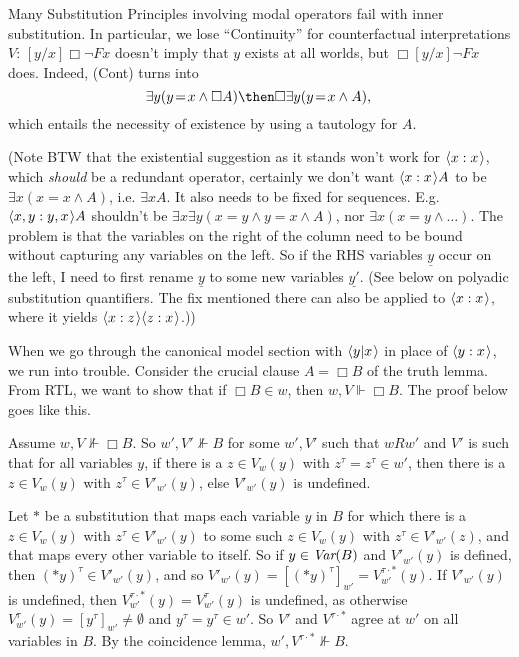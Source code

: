 \documentclass[11pt]{woarticle}
\theoremstyle{break}
\theoremstyle{nonumberplain}
\newcommand{\SAT}{\Vdash}
\newcommand{\1}{\;\,|\;\,}
\newcommand{\var}{\emph{Var}}
\renewcommand{\t}[1]{\ensuremath{\langle #1  \makebox[.2ex]{}\rangle}}
\renewcommand{\vec}[1]{\ensuremath{\underline{#1}}}
\begin{document}
{  Many Substitution Principles involving modal operators fail with
  inner substitution. In particular, we lose ``Continuity'' for
  counterfactual interpretations $V$: $[y/x]\Box \neg Fx$ doesn't
  imply that $y$ exists at all worlds, but $\Box[y/x]\neg Fx$
  does. Indeed, (Cont) turns into
  \begin{equation*}
    \exists y(y\!=\!x \land \Box A) \then \Box\exists y(y\!=\!x \land A),\\
  \end{equation*}
  which entails the necessity of existence by using a tautology for
  $A$.

  (Note BTW that the existential suggestion as it stands won't work
  for $\t{x:x}$, which \emph{should} be a redundant operator,
  certainly we don't want $\t{x:x}A$ to be $\exists x(x\!=\!x \land
  A)$, i.e. $\exists x A$. It also needs to be fixed for
  sequences. E.g. $\t{x,y:y,x}A$ shouldn't be $\exists x\exists
  y(x\!=\!y \land y\!=\!x \land A)$, nor $\exists x(x\!=\!y \land
  \ldots)$. The problem is that the variables on the right of the
  column need to be bound without capturing any variables on the
  left. So if the RHS variables $\vec{y}$ occur on the left, I need to
  first rename $\vec{y}$ to some new variables $\vec{y'}$. (See below
  on polyadic substitution quantifiers. The fix mentioned there can also be
  applied to $\t{x:x}$, where it yields $\t{x:z}\t{z:x}$.))

  When we go through the canonical model section with $\t{y|x}$ in
  place of $\t{y:x}$, we run into trouble. Consider the crucial clause
  $A = \Box B$ of the truth lemma. From RTL, we want to show that if
  $\Box B \in w$, then $w,V \SAT \Box B$. The proof below goes like this.

  Assume $w,V \not\SAT \Box B$. So $w',V' \not\SAT B$ for some $w',V'$
  such that $wRw'$ and $V'$ is such that for all variables $y$, if
  there is a $z \in V_w(y)$ with $z^\tau\!=\!z^\tau \in w'$, then
  there is a $z \in V_w(y)$ with $z^\tau \in V'_{w'}(y)$, else
  $V'_{w'}(y)$ is undefined.

  Let $*$ be a substitution that maps each variable $y$ in $B$ for
  which there is a $z \in V_w(y)$ with $z^\tau \in V'_{w'}(y)$ to some
  such $z\in V_w(y)$ with $z^\tau \in V'_{w'}(z)$, and that maps every
  other variable to itself. So if $y \in \var(B)$ and $V'_{w'}(y)$ is
  defined, then $(*y)^\tau \in V'_{w'}(y)$, and so $V'_{w'}(y) =
  [(*y)^\tau]_{w'} = V^{\tau\cdot *}_{w'}(y)$. If $V'_{w'}(y)$ is
  undefined, then $V^{\tau\cdot *}_{w'}(y) = V^{\tau}_{w'}(y)$ is
  undefined, as otherwise $V^{\tau}_{w'}(y) = [y^\tau]_{w'} \not=
  \emptyset$ and $y^\tau\!=\!y^\tau \in w'$. So $V'$ and $V^{\tau\cdot
    *}$ agree at $w'$ on all variables in $B$. By the coincidence
  lemma, $w',V^{\tau\cdot *} \not\SAT B$.

}
\end{document}
